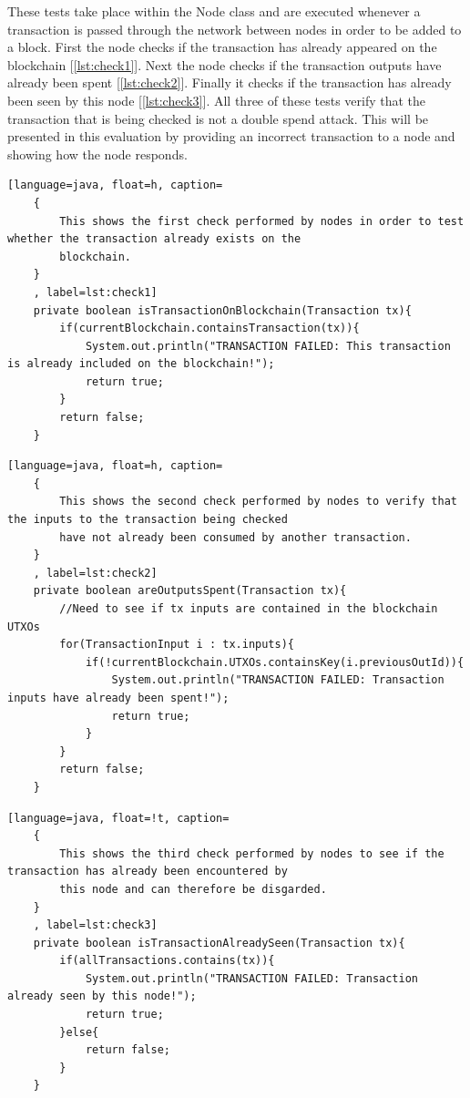 \documentclass{l4proj}
\begin{document}
These tests take place within the Node class and are executed whenever a transaction is passed through the network
between nodes in order to be added to a block. First the node checks if the transaction has already appeared on the
blockchain [\ref{lst:check1}]. Next the node checks if the transaction outputs have already been spent [\ref{lst:check2}]. 
Finally it checks if the transaction has already been seen by this node [\ref{lst:check3}]. All three of these tests 
verify that the transaction that is being checked is not a double spend attack. This will be presented in this 
evaluation by providing an incorrect transaction to a node and showing how the node responds.

\begin{lstlisting}[language=java, float=h, caption=
    {
        This shows the first check performed by nodes in order to test whether the transaction already exists on the
        blockchain.
    }
    , label=lst:check1]
    private boolean isTransactionOnBlockchain(Transaction tx){
        if(currentBlockchain.containsTransaction(tx)){
            System.out.println("TRANSACTION FAILED: This transaction is already included on the blockchain!");
            return true;
        }
        return false;
    }
\end{lstlisting}

\begin{lstlisting}[language=java, float=h, caption=
    {
        This shows the second check performed by nodes to verify that the inputs to the transaction being checked
        have not already been consumed by another transaction.
    }
    , label=lst:check2]
    private boolean areOutputsSpent(Transaction tx){
        //Need to see if tx inputs are contained in the blockchain UTXOs
        for(TransactionInput i : tx.inputs){
            if(!currentBlockchain.UTXOs.containsKey(i.previousOutId)){
                System.out.println("TRANSACTION FAILED: Transaction inputs have already been spent!");
                return true;
            }
        }
        return false;
    }
\end{lstlisting}

\begin{lstlisting}[language=java, float=!t, caption=
    {
        This shows the third check performed by nodes to see if the transaction has already been encountered by
        this node and can therefore be disgarded.
    }
    , label=lst:check3]
    private boolean isTransactionAlreadySeen(Transaction tx){
        if(allTransactions.contains(tx)){
            System.out.println("TRANSACTION FAILED: Transaction already seen by this node!");
            return true;
        }else{
            return false;
        }
    }
\end{lstlisting}
\end{document}
